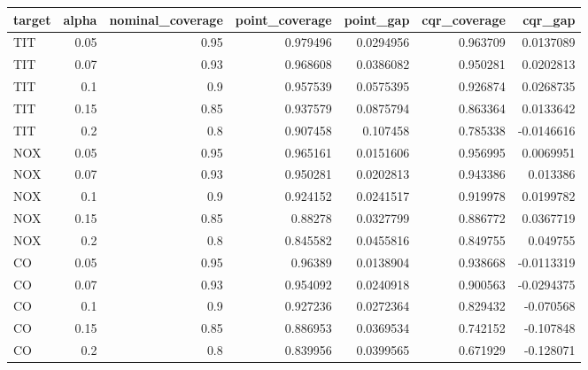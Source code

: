 \begin{tabular}{lrrrrrr}
\toprule
target & alpha & nominal\_coverage & point\_coverage & point\_gap & cqr\_coverage & cqr\_gap \\
\midrule
TIT & 0.05 & 0.95 & 0.979496 & 0.0294956 & 0.963709 & 0.0137089 \\
TIT & 0.07 & 0.93 & 0.968608 & 0.0386082 & 0.950281 & 0.0202813 \\
TIT & 0.1 & 0.9 & 0.957539 & 0.0575395 & 0.926874 & 0.0268735 \\
TIT & 0.15 & 0.85 & 0.937579 & 0.0875794 & 0.863364 & 0.0133642 \\
TIT & 0.2 & 0.8 & 0.907458 & 0.107458 & 0.785338 & -0.0146616 \\
NOX & 0.05 & 0.95 & 0.965161 & 0.0151606 & 0.956995 & 0.0069951 \\
NOX & 0.07 & 0.93 & 0.950281 & 0.0202813 & 0.943386 & 0.013386 \\
NOX & 0.1 & 0.9 & 0.924152 & 0.0241517 & 0.919978 & 0.0199782 \\
NOX & 0.15 & 0.85 & 0.88278 & 0.0327799 & 0.886772 & 0.0367719 \\
NOX & 0.2 & 0.8 & 0.845582 & 0.0455816 & 0.849755 & 0.049755 \\
CO & 0.05 & 0.95 & 0.96389 & 0.0138904 & 0.938668 & -0.0113319 \\
CO & 0.07 & 0.93 & 0.954092 & 0.0240918 & 0.900563 & -0.0294375 \\
CO & 0.1 & 0.9 & 0.927236 & 0.0272364 & 0.829432 & -0.070568 \\
CO & 0.15 & 0.85 & 0.886953 & 0.0369534 & 0.742152 & -0.107848 \\
CO & 0.2 & 0.8 & 0.839956 & 0.0399565 & 0.671929 & -0.128071 \\
\bottomrule
\end{tabular}
